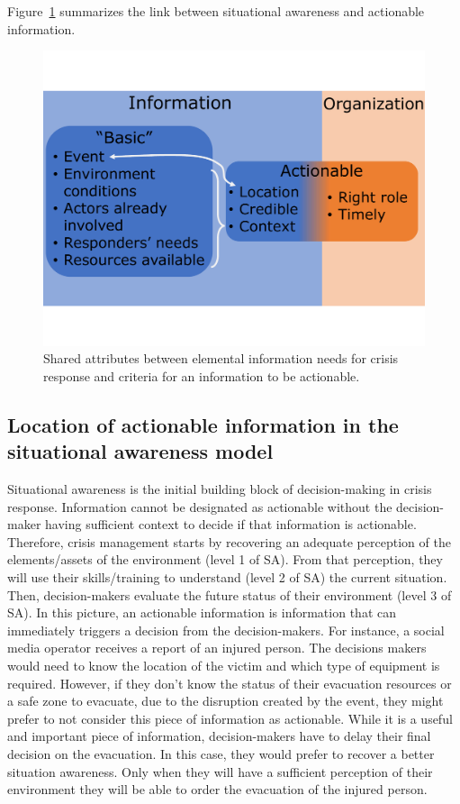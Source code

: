 Figure~\ref{information:sa-inf} summarizes the link between situational awareness and actionable information.

\begin{figure}[htb]
    \centering
    \includegraphics[width=\textwidth]{figures/chap-3/sa-ainf.pdf}
    \caption{Shared attributes between elemental information needs for crisis response and criteria for an information to be actionable.}
    \label{information:sa-inf}
\end{figure}

\subsection{Location of actionable information in the situational awareness model}
Situational awareness is the initial building block of decision-making in crisis response.
Information cannot be designated as actionable without the decision-maker having sufficient context to decide if that information is actionable.
Therefore, crisis management starts by recovering an adequate perception of the elements/assets of the environment (level 1 of SA).
From that perception, they will use their skills/training to understand (level 2 of SA) the current situation.
Then, decision-makers evaluate the future status of their environment (level 3 of SA).
In this picture, an actionable information is information that can immediately triggers a decision from the decision-makers.
For instance, a social media operator receives a report of an injured person.
The decisions makers would need to know the location of the victim and which type of equipment is required.
However, if they don't know the status of their evacuation resources or a safe zone to evacuate,
due to the disruption created by the event, they might prefer to not consider this piece of information as actionable.
While it is a useful and important piece of information, decision-makers have to delay their final decision on the evacuation.
In this case, they would prefer to recover a better situation awareness.
Only when they will have a sufficient perception of their environment they will be able to order the evacuation of the injured person.

